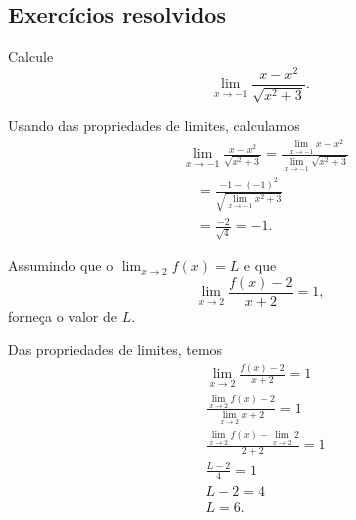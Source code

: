 \subsection{Exercícios resolvidos}


\begin{exeresol}
  Calcule
  \begin{equation}
    \lim_{x\to -1} \frac{x - x^2}{\sqrt{x^2+3}}.
  \end{equation}
\end{exeresol}
\begin{resol}
  Usando das propriedades de limites, calculamos
  \begin{align}
    & \lim_{x\to -1} \frac{x-x^2}{\sqrt{x^2+3}} = \frac{\displaystyle\lim_{x\to -1} x-x^2}{\displaystyle\lim_{x\to -1} \sqrt{x^2+3}} \\
    & \text{}\quad = \frac{-1-(-1)^2}{\displaystyle\sqrt{\lim_{x\to -1} x^2+3}} \\
    & \text{}\quad = \frac{-2}{\sqrt{4}} = -1.
  \end{align}
\end{resol}

\begin{exeresol}
  Assumindo que o $\lim_{x\to 2} f(x) = L$ e que
  \begin{equation}
    \lim_{x\to 2} \frac{f(x)-2}{x+2} = 1,
  \end{equation}
  forneça o valor de $L$.
\end{exeresol}
\begin{resol}
  Das propriedades de limites, temos
  \begin{align}
    & \lim_{x\to 2} \frac{f(x)-2}{x+2} = 1 \\
    & \frac{\displaystyle\lim_{x\to 2} f(x)-2}{\displaystyle\lim_{x\to 2} x+2} = 1 \\
    & \frac{\lim_{x\to 2} f(x) - \lim_{x\to 2} 2}{2+2} = 1 \\
    & \frac{L-2}{4} = 1\\
    & L-2 = 4\\
    & L = 6.
  \end{align}
\end{resol}


